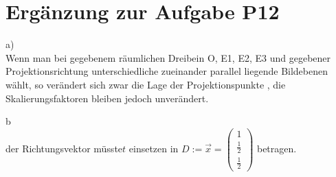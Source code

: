 
\setcounter{H-section}{17}
\renewcommand*\thesection{H\Nummerierung{\arabic{H-section}}}
\section{Ergänzung zur Aufgabe P12}

a)\\
Wenn man bei gegebenem räumlichen Dreibein
O, E1, E2, E3 und gegebener Projektionsrichtung
unterschiedliche zueinander parallel liegende Bildebenen wählt, so verändert sich zwar die Lage der Projektionspunkte , die Skalierungsfaktoren bleiben jedoch unverändert.

b\\
der Richtungsvektor müsste\ensuremath{t} einsetzen in \ensuremath{D:= \vec{x}=\begin{pmatrix}
		1\\\frac{1}{2}\\ \frac{1}{2}
	\end{pmatrix}} betragen.
